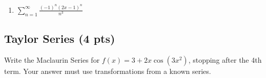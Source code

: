 \documentclass[
]{article}
\providecommand{\tightlist}{%
  \setlength{\itemsep}{0pt}\setlength{\parskip}{0pt}}
\begin{document}
\begin{enumerate}
\def\labelenumi{\arabic{enumi}.}
\setcounter{enumi}{5}
\tightlist
\item
  \(\displaystyle \sum_{n=1}^{\infty} \frac{(-1)^n (2x-1)^n}{n^3}\)
\end{enumerate}
\vspace{2.5in*}

\hypertarget{taylor-series-4-pts}{%
\subsection{Taylor Series (4 pts)}\label{taylor-series-4-pts}}

Write the Maclaurin Series for \(f(x) = 3+2x\cos(3x^2)\), stopping after
the 4th term. Your answer must use transformations from a known series.
\end{document}
